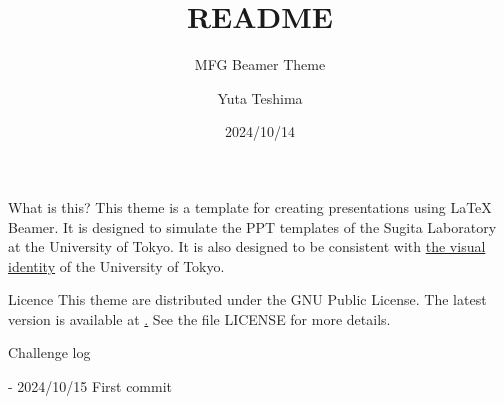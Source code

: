 \documentclass{mfg-slide}
\title{README}
\subtitle{MFG Beamer Theme}
\author{Yuta Teshima}
\date{2024/10/14}
\begin{document}
\begin{frame}
    \titlepage
\end{frame}

\begin{frame}{What is this?}
    This theme is a template for creating presentations using LaTeX Beamer.
    It is designed to simulate the PPT templates of the Sugita Laboratory at the University of Tokyo.
    It is also designed to be consistent with
    \href{https://www.u-tokyo.ac.jp/ja/about/public-relations/visual_identity.html}{the visual identity}
    of the University of Tokyo.
\end{frame}

\begin{frame}{Licence}
    This theme are distributed under the GNU Public License.
    The latest version is available at \href{https://www.gnu.org/licenses/gpl-3.0.html}.
    See the file LICENSE for more details.
\end{frame}

\begin{frame}{Challenge log}

    - 2024/10/15 First commit

\end{frame}
\end{document}
